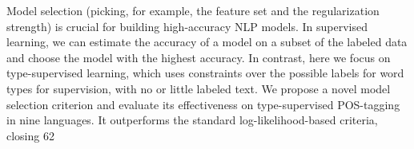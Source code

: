 Model selection (picking, for example, the feature set and the regularization strength) is crucial for building high-accuracy NLP models. In supervised learning, we can estimate the accuracy of a model on a subset of the labeled data and choose the model with the highest accuracy. In contrast, here we focus on  type-supervised learning, which uses constraints over the possible labels for word types for supervision, with no or little labeled text. We propose a novel model selection criterion and evaluate its effectiveness on type-supervised POS-tagging in nine languages. It outperforms the standard log-likelihood-based criteria, closing 62\\%
